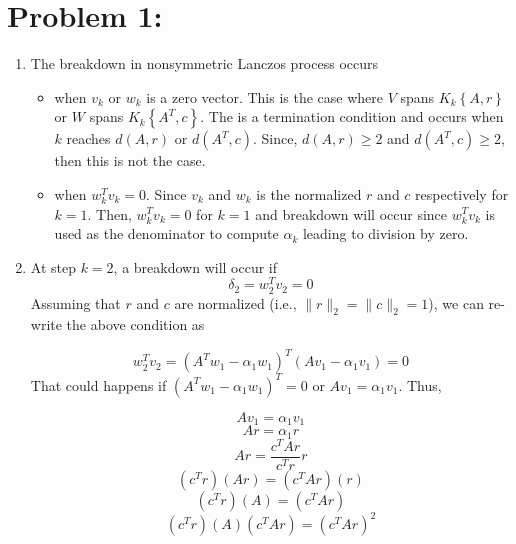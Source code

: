 \section*{Problem 1:}
\begin{enumerate}
\item The breakdown in nonsymmetric Lanczos process occurs
\begin{itemize}
\item when $v_{k}$ or $w_{k}$ is a zero vector. This is the case where $V$ spans $K_{k}
\left\lbrace A,r \right\rbrace$ or $W$ spans $K_{k}\left\lbrace A^{T},c \right\rbrace$. The is a termination condition and occurs when $k$ reaches $d(A,r)$ or $d(A^{T},c)$. Since, $d(A,r) \geq 2$ and $d(A^{T},c) \geq 2$, then this is not the case. 

\item when $w_{k}^{T}v_{k} =0$. Since $v_{k}$ and $w_{k}$ is the normalized $r$ and $c$ respectively for $k=1$. Then, $w_{k}^{T}v_{k} = 0$ for $k=1$ and breakdown will occur since $w_{k}^{T}v_{k}$ is used as the denominator to compute $\alpha_{k}$ leading to division by zero. 
\end{itemize}

\item At step $k = 2$, a breakdown will occur if 
$$
\delta_{2} = w_{2}^{T}v_{2} = 0
$$
Assuming that $r$ and $c$ are normalized (i.e., $\parallel r\parallel_{2} = \parallel c\parallel_{2} =1$), we can re-write the above condition as 

$$
w_{2}^{T}v_{2} = (A^{T}w_{1} - \alpha_{1}w_{1})^{T} (Av_{1} - \alpha_{1}v_{1}) = 0
$$
That could happens if  $(A^{T}w_{1} - \alpha_{1}w_{1})^{T}=0$ or $Av_{1} = \alpha_{1}v_{1}$. Thus, 

$$
Av_{1} = \alpha_{1}v_{1}
$$
$$
Ar = \alpha_{1}r
$$
$$
Ar = \frac{c^{T}Ar}{c^{T}r}r
$$
$$
(c^{T}r)(Ar) = (c^{T}Ar)(r)
$$
$$
(c^{T}r)(A) = (c^{T}Ar)
$$
$$
(c^{T}r)(A)(c^{T}Ar) = (c^{T}Ar)^{2}
$$

\end{enumerate}
